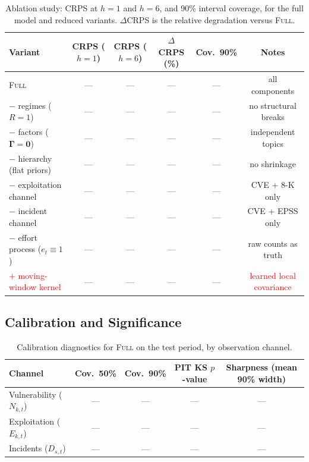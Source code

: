 \documentclass[review]{elsarticle}
\newcommand{\rev}[1]{\textcolor{red}{#1}}
\newcommand{\rev}[1]{#1}
\begin{document}
\begin{table}
\centering
\caption{Ablation study: CRPS at $h=1$ and $h=6$, and 90\% interval coverage, for the full model and reduced variants. $\Delta$CRPS is the relative degradation versus \textsc{Full}.}
\label{tab:ablation}
\small
\begin{tabular}{lccccc}
\toprule
Variant & CRPS ($h{=}1$) & CRPS ($h{=}6$) & $\Delta$CRPS (\%) & Cov.\ 90\% & Notes \\
\midrule
\textsc{Full}                       & --- & --- & ---   & --- & all components \\
$-$ regimes ($R=1$)                 & --- & --- & --- & --- & no structural breaks \\
$-$ factors ($\bm{\Gamma}=\bm{0}$)  & --- & --- & --- & --- & independent topics \\
$-$ hierarchy (flat priors)         & --- & --- & --- & --- & no shrinkage \\
$-$ exploitation channel            & --- & --- & --- & --- & CVE + 8-K only \\
$-$ incident channel                & --- & --- & --- & --- & CVE + EPSS only \\
$-$ effort process ($e_t \equiv 1$) & --- & --- & --- & --- & raw counts as truth \\
\rev{$+$ moving-window kernel}      & --- & --- & --- & --- & \rev{learned local covariance} \\
\bottomrule
\end{tabular}
\end{table}

\subsection{Calibration and Significance}

\begin{table}
\centering
\caption{Calibration diagnostics for \textsc{Full} on the test period, by observation channel.}
\label{tab:calibration}
\small
\begin{tabular}{lcccc}
\toprule
Channel & Cov.\ 50\% & Cov.\ 90\% & PIT KS $p$-value & Sharpness (mean 90\% width) \\
\midrule
Vulnerability ($N_{k,t}$) & --- & --- & --- & --- \\
Exploitation ($E_{k,t}$)  & --- & --- & --- & --- \\
Incidents ($D_{s,t}$)     & --- & --- & --- & --- \\
\bottomrule
\end{tabular}
\end{table}
\end{document}
